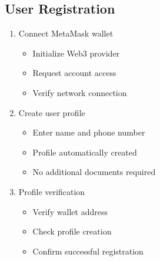 \documentclass[12pt,a4paper]{article}
\begin{document}
    \subsection{User Registration}
    \begin{enumerate}
        \item Connect MetaMask wallet
        \begin{itemize}
            \item Initialize Web3 provider
            \item Request account access
            \item Verify network connection
        \end{itemize}

        \item Create user profile
        \begin{itemize}
            \item Enter name and phone number
            \item Profile automatically created
            \item No additional documents required
        \end{itemize}

        \item Profile verification
        \begin{itemize}
            \item Verify wallet address
            \item Check profile creation
            \item Confirm successful registration
        \end{itemize}
    \end{enumerate}
\end{document}
